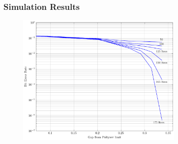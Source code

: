 \documentclass[10pt]{beamer}
\begin{document}
\begin{frame}
\begin{figure}
\begin{center}
        \end{center}
    \end{figure}
\end{frame}

\begin{frame}\frametitle{Simulation Results}

\begin{figure}
\begin{center}
\includegraphics[width=3.2in]{BER_iters_4_72_9}
\end{center}
\end{figure}
\end{frame}
\end{document}
